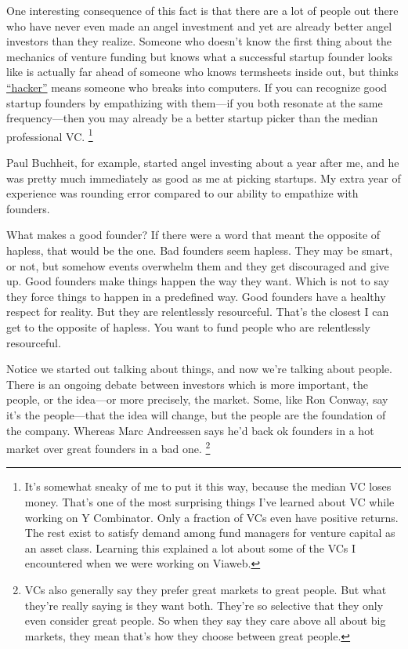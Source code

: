 \documentclass[12pt]{book}
\begin{document}
One interesting consequence of this fact is that there are a lot of
people out there who have never even made an angel investment and yet
are already better angel investors than they realize. Someone who
doesn't know the first thing about the mechanics of venture funding but
knows what a successful startup founder looks like is actually far ahead
of someone who knows termsheets inside out, but thinks
\href{gba.html}{``hacker''} means someone who breaks into computers. If
you can recognize good startup founders by empathizing with them---if
you both resonate at the same frequency---then you may already be a
better startup picker than the median professional VC.
\footnote{It's somewhat sneaky of me to put it this way, because the
median VC loses money. That's one of the most surprising things I've
learned about VC while working on Y Combinator. Only a fraction of VCs
even have positive returns. The rest exist to satisfy demand among fund
managers for venture capital as an asset class. Learning this explained
a lot about some of the VCs I encountered when we were working on
Viaweb.}

Paul Buchheit, for example, started angel investing about a year after
me, and he was pretty much immediately as good as me at picking
startups. My extra year of experience was rounding error compared to our
ability to empathize with founders.

What makes a good founder? If there were a word that meant the opposite
of hapless, that would be the one. Bad founders seem hapless. They may
be smart, or not, but somehow events overwhelm them and they get
discouraged and give up. Good founders make things happen the way they
want. Which is not to say they force things to happen in a predefined
way. Good founders have a healthy respect for reality. But they are
relentlessly resourceful. That's the closest I can get to the opposite
of hapless. You want to fund people who are relentlessly resourceful.

Notice we started out talking about things, and now we're talking about
people. There is an ongoing debate between investors which is more
important, the people, or the idea---or more precisely, the market.
Some, like Ron Conway, say it's the people---that the idea will change,
but the people are the foundation of the company. Whereas Marc
Andreessen says he'd back ok founders in a hot market over great
founders in a bad one. \footnote{VCs also generally say they prefer great markets to great
people. But what they're really saying is they want both. They're so
selective that they only even consider great people. So when they say
they care above all about big markets, they mean that's how they choose
between great people.}
\end{document}
